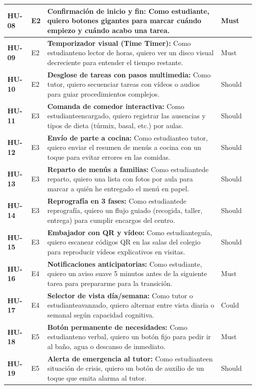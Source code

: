 \documentclass[11pt,a4paper]{article}
\begin{document}
{\begin{longtable}{|>{\centering\bfseries\arraybackslash}p{1.3cm}|>{\centering\arraybackslash}p{1.1cm}|>{\raggedright\arraybackslash}p{7.4cm}|>{\centering\arraybackslash}p{1.6cm}|>{\centering\arraybackslash}p{0.8cm}|}
HU-08 & E2 & \textbf{Confirmación de inicio y fin:} Como estudiante, quiero botones gigantes para marcar cuándo empiezo y cuándo acabo una tarea. & Must & 2 \\ \hline
HU-09 & E2 & \textbf{Temporizador visual (Time Timer):} Como estudianteno lector de horas, quiero ver un disco visual decreciente para entender el tiempo restante. & Must & 3 \\ \hline
HU-10 & E2 & \textbf{Desglose de tareas con pasos multimedia:} Como tutor, quiero secuenciar tareas con vídeos o audios para guiar procedimientos complejos. & Should & 5 \\ \hline
HU-11 & E3 & \textbf{Comanda de comedor interactiva:} Como estudianteencargado, quiero registrar las ausencias y tipos de dieta (túrmix, basal, etc.) por aulas. & Should & 5 \\ \hline
HU-12 & E3 & \textbf{Envío de parte a cocina:} Como estudianteo tutor, quiero enviar el resumen de menús a cocina con un toque para evitar errores en las comidas. & Should & 3 \\ \hline
HU-13 & E3 & \textbf{Reparto de menús a familias:} Como estudiantede reparto, quiero una lista con fotos por aula para marcar a quién he entregado el menú en papel. & Should & 3 \\ \hline
HU-14 & E3 & \textbf{Reprografía en 3 fases:} Como estudiantede reprografía, quiero un flujo guiado (recogida, taller, entrega) para cumplir encargos del centro. & Should & 5 \\ \hline
HU-15 & E3 & \textbf{Embajador con QR y vídeo:} Como estudianteguía, quiero escanear códigos QR en las salas del colegio para reproducir vídeos explicativos en visitas. & Should & 5 \\ \hline
HU-16 & E4 & \textbf{Notificaciones anticipatorias:} Como estudiante, quiero un aviso suave 5 minutos antes de la siguiente tarea para prepararme para la transición. & Must & 2 \\ \hline
HU-17 & E4 & \textbf{Selector de vista día/semana:} Como tutor o estudianteavanzado, quiero alternar entre vista diaria o semanal según capacidad cognitiva. & Could & 2 \\ \hline
HU-18 & E5 & \textbf{Botón permanente de necesidades:} Como estudianteno verbal, quiero un botón fijo para pedir ir al baño, agua o descanso de inmediato. & Must & 3 \\ \hline
HU-19 & E5 & \textbf{Alerta de emergencia al tutor:} Como estudianteen situación de crisis, quiero un botón de auxilio de un toque que emita alarma al tutor. & Should & 3 \\ \hline

\end{longtable}}
\end{document}
